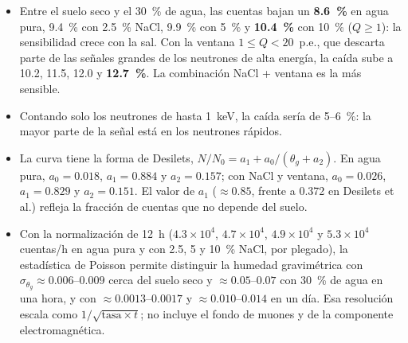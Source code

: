 \documentclass[11pt,a4paper]{article}
\begin{document}
\begin{itemize}
\item Entre el suelo seco y el 30~\% de agua, las cuentas bajan un \textbf{8.6~\%} en agua pura, 9.4~\% con 2.5~\%
NaCl, 9.9~\% con 5~\% y \textbf{10.4~\%} con 10~\% ($Q\geq1$): la sensibilidad crece con la sal. Con la ventana
$1\leq Q<20$~p.e., que descarta parte de las señales grandes de los neutrones de alta energía, la caída sube a 10.2, 11.5, 12.0 y
\textbf{12.7~\%}. La combinación NaCl + ventana es la más sensible.
\item Contando solo los neutrones de hasta 1~keV, la caída sería de 5--6~\%: la mayor parte de la señal está en los
neutrones rápidos.
\item La curva tiene la forma de Desilets, $N/N_0 = a_1 + a_0/(\theta_g + a_2)$. En agua pura,
$a_0 = 0.018$, $a_1 = 0.884$ y $a_2 = 0.157$; con NaCl y ventana, $a_0 = 0.026$, $a_1 = 0.829$ y $a_2 = 0.151$. El valor de
$a_1$ ($\approx0.85$, frente a 0.372 en Desilets et al.) refleja la fracción de cuentas que no depende del suelo.
\item Con la normalización de 12~h ($4.3\times10^4$, $4.7\times10^4$, $4.9\times10^4$ y $5.3\times10^4$ cuentas/h en agua pura y con 2.5, 5 y
10~\% NaCl, por plegado), la estadística de Poisson permite distinguir la humedad gravimétrica con $\sigma_{\theta_g}\approx0.006$--$0.009$
cerca del suelo seco y $\approx0.05$--$0.07$ con 30~\% de agua en una hora, y con $\approx0.0013$--$0.0017$ y
$\approx0.010$--$0.014$ en un día. Esa resolución escala como $1/\sqrt{\text{tasa}\times t}$; no incluye el fondo de
muones y de la componente electromagnética.
\end{itemize}
\end{document}
